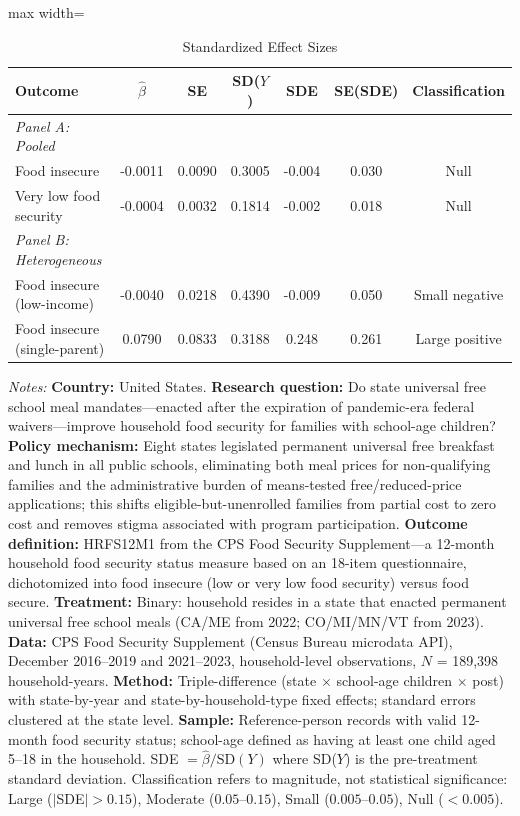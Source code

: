 \begin{table}[t]
\centering
\caption{Standardized Effect Sizes}
\label{tab:sde}
\begin{adjustbox}{max width=\textwidth}
\begin{tabular}{lcccccc}
\hline\hline
Outcome & $\hat{\beta}$ & SE & SD($Y$) & SDE & SE(SDE) & Classification \\
\hline
\textit{Panel A: Pooled} & & & & & & \\
\quad Food insecure & -0.0011 & 0.0090 & 0.3005 & -0.004 & 0.030 & Null \\
\quad Very low food security & -0.0004 & 0.0032 & 0.1814 & -0.002 & 0.018 & Null \\
\addlinespace
\textit{Panel B: Heterogeneous} & & & & & & \\
\quad Food insecure (low-income) & -0.0040 & 0.0218 & 0.4390 & -0.009 & 0.050 & Small negative \\
\quad Food insecure (single-parent) & 0.0790 & 0.0833 & 0.3188 & 0.248 & 0.261 & Large positive \\
\hline
\end{tabular}
\end{adjustbox}
\par\vspace{0.5em}
{\footnotesize \textit{Notes:} \textbf{Country:} United States. \textbf{Research question:} Do state universal free school meal mandates---enacted after the expiration of pandemic-era federal waivers---improve household food security for families with school-age children? \textbf{Policy mechanism:} Eight states legislated permanent universal free breakfast and lunch in all public schools, eliminating both meal prices for non-qualifying families and the administrative burden of means-tested free/reduced-price applications; this shifts eligible-but-unenrolled families from partial cost to zero cost and removes stigma associated with program participation. \textbf{Outcome definition:} HRFS12M1 from the CPS Food Security Supplement---a 12-month household food security status measure based on an 18-item questionnaire, dichotomized into food insecure (low or very low food security) versus food secure. \textbf{Treatment:} Binary: household resides in a state that enacted permanent universal free school meals (CA/ME from 2022; CO/MI/MN/VT from 2023). \textbf{Data:} CPS Food Security Supplement (Census Bureau microdata API), December 2016--2019 and 2021--2023, household-level observations, $N$ = 189,398 household-years. \textbf{Method:} Triple-difference (state $\times$ school-age children $\times$ post) with state-by-year and state-by-household-type fixed effects; standard errors clustered at the state level. \textbf{Sample:} Reference-person records with valid 12-month food security status; school-age defined as having at least one child aged 5--18 in the household. SDE $= \hat{\beta} / \text{SD}(Y)$ where SD($Y$) is the pre-treatment standard deviation. Classification refers to magnitude, not statistical significance: Large ($|$SDE$| > 0.15$), Moderate ($0.05$--$0.15$), Small ($0.005$--$0.05$), Null ($< 0.005$).}
\end{table}
